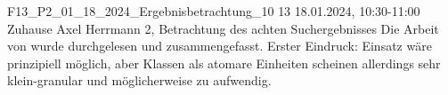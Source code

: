 \fieldnote
{F13\_P2\_01\_18\_2024\_Ergebnisbetrachtung\_10}
{13}
{18.01.2024, 10:30-11:00}
{Zuhause}
{Axel Herrmann}
{2, Betrachtung des achten Suchergebnisses}
{
  Die Arbeit von  wurde durchgelesen und zusammengefasst.
}
{
}
{
  Erster Eindruck: Einsatz wäre prinzipiell möglich, aber
}
{
  Klassen als atomare Einheiten scheinen allerdings sehr klein-granular und möglicherweise zu aufwendig.
}
{
}
